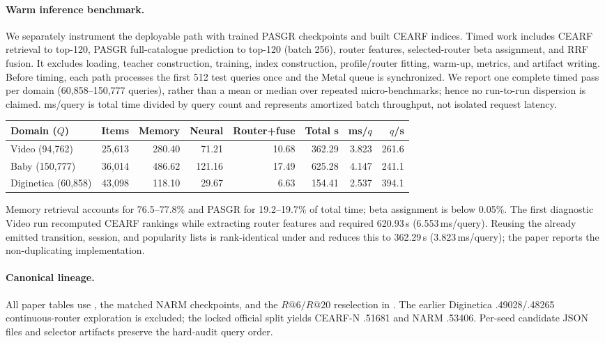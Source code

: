 \documentclass[runningheads]{llncs}
\newcommand{\method}{CEARF-N}
\begin{document}
\paragraph{Warm inference benchmark.}
We separately instrument the deployable path with trained PASGR checkpoints
and built CEARF indices. Timed work includes CEARF retrieval to top-120,
PASGR full-catalogue prediction to top-120 (batch 256), router features,
selected-router beta assignment, and RRF fusion. It excludes loading, teacher
construction, training, index construction, profile/router fitting, warm-up,
metrics, and artifact writing. Before timing, each path processes the first
512 test queries once and the Metal queue is synchronized. We report one
complete timed pass per domain (60,858--150,777 queries), rather than a mean
or median over repeated micro-benchmarks; hence no run-to-run dispersion is
claimed. ms/query is total time divided by query count and represents
amortized batch throughput, not isolated request latency.
\begin{center}
\small
\setlength{\tabcolsep}{3pt}
\begin{tabular}{lrrrrrrr}
\toprule
Domain ($Q$) & Items & Memory & Neural & Router+fuse & Total s & ms/$q$ & $q$/s\\
\midrule
Video (94,762) & 25,613 & 280.40 & 71.21 & 10.68 & 362.29 &
3.823 & 261.6\\
Baby (150,777) & 36,014 & 486.62 & 121.16 & 17.49 & 625.28 &
4.147 & 241.1\\
Diginetica (60,858) & 43,098 & 118.10 & 29.67 & 6.63 & 154.41 &
2.537 & 394.1\\
\bottomrule
\end{tabular}
\end{center}
Memory retrieval accounts for 76.5--77.8\% and PASGR for 19.2--19.7\% of
total time; beta assignment is below 0.05\%. The first diagnostic Video run
recomputed CEARF rankings while extracting router features and required
620.93\,s (6.553\,ms/query). Reusing the already emitted transition, session,
and popularity lists is rank-identical under
 and reduces this to 362.29\,s
(3.823\,ms/query); the paper reports the non-duplicating implementation.

\paragraph{Canonical lineage.}
All paper tables use , the matched NARM
checkpoints, and the $R@6/R@20$ reselection in
. The earlier Diginetica
.49028/.48265 continuous-router exploration is excluded; the locked official
split yields \method{} .51681 and NARM .53406. Per-seed candidate JSON files
and selector artifacts preserve the hard-audit query order.
\end{document}
